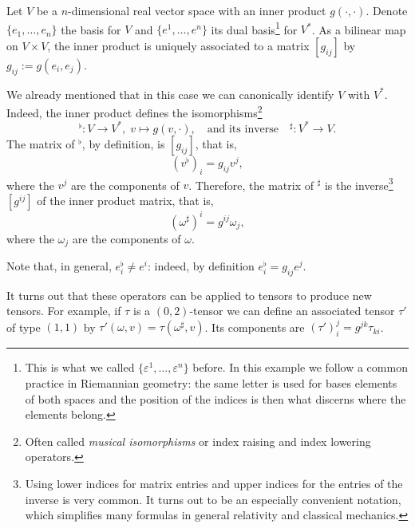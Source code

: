 \begin{example}\label{ex:musicaliso}
	Let $V$ be a $n$-dimensional real vector space with an inner product $g(\cdot, \cdot)$.
	Denote $\{e_1, \ldots, e_n\}$ the basis for $V$ and $\{e^1, \ldots, e^n\}$ its dual basis\footnote{This is what we called $\{\varepsilon^1, \ldots,\varepsilon^n\}$ before. In this example we follow a common practice in Riemannian geometry: the same letter is used for bases elements of both spaces and the position of the indices is then what discerns where the elements belong.} for $V^*$.
	As a bilinear map on $V\times V$, the inner product is uniquely associated to a matrix $[g_{ij}]$ by $g_{ij} := g(e_i, e_j)$.

	We already mentioned that in this case we can canonically identify $V$ with $V^*$.
	Indeed, the inner product defines the isomorphisms\footnote{Often called \emph{musical isomorphisms} or index raising and index lowering operators.}
	\begin{equation}
		{}^\flat: V \to V^*,\; v\mapsto g(v, \cdot),
		\quad\mbox{and its inverse}\quad
		{}^\sharp: V^*\to V.
	\end{equation}
	The matrix of ${}^\flat$, by definition, is $[g_{ij}]$, that is,
	\begin{equation}
		(v^\flat)_i = g_{ij} v^j,
	\end{equation}
	where the $v^j$ are the components of $v$.
	Therefore, the matrix of ${}^\sharp$ is the inverse\footnote{Using lower indices for matrix entries and upper indices for the entries of the inverse is very common. It turns out to be an especially convenient notation, which simplifies many formulas in general relativity and classical mechanics.} $[g^{ij}]$ of the inner product matrix, that is,
	\begin{equation}
		(\omega^\sharp)^i = g^{ij}\omega_j,
	\end{equation}
	where the $\omega_j$ are the components of $\omega$.

	Note that, in general, $e^\flat_i\neq e^i$: indeed, by definition $e^\flat_i = g_{ij}e^j$.

	It turns out that these operators can be applied to tensors to produce new tensors.
	For example, if $\tau$ is a $(0,2)$-tensor we can define an associated tensor $\tau'$ of type $(1,1)$ by $\tau'(\omega, v) = \tau(\omega^\sharp, v)$.
	Its components are $(\tau')_i^j = g^{jk}\tau_{ki}$.
\end{example}

